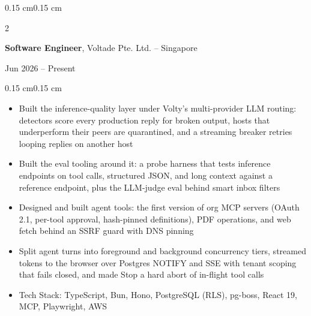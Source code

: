 \documentclass[10pt, letterpaper]{article}
\newenvironment{highlights}{
    \begin{itemize}[
        topsep=0.08 cm,
        parsep=0.05 cm,
        partopsep=0pt,
        itemsep=0pt,
        leftmargin=0.4 cm
    ]
}{
    \end{itemize}
}
\newenvironment{onecolentry}{
    \begin{adjustwidth}{0.15 cm}{0.15 cm}
}{
    \end{adjustwidth}
}
\newenvironment{twocolentry}[2][]{
    \onecolentry
    \def\secondColumn{#2}
    \setcolumnwidth{\fill, 4.5 cm}
    \begin{paracol}{2}
}{
    \switchcolumn \raggedleft \secondColumn
    \end{paracol}
    \endonecolentry
}
\begin{document}
        \begin{twocolentry}{
            Jun 2026 -- Present
        }
            \textbf{Software Engineer}, Voltade Pte. Ltd. -- Singapore
        \end{twocolentry}
        \vspace{0.08 cm}
        \begin{onecolentry}
            \begin{highlights}
                \item Built the inference-quality layer under Volty's multi-provider LLM routing: detectors score every production reply for broken output, hosts that underperform their peers are quarantined, and a streaming breaker retries looping replies on another host
                \item Built the eval tooling around it: a probe harness that tests inference endpoints on tool calls, structured JSON, and long context against a reference endpoint, plus the LLM-judge eval behind smart inbox filters
                \item Designed and built agent tools: the first version of org MCP servers (OAuth 2.1, per-tool approval, hash-pinned definitions), PDF operations, and web fetch behind an SSRF guard with DNS pinning
                \item Split agent turns into foreground and background concurrency tiers, streamed tokens to the browser over Postgres NOTIFY and SSE with tenant scoping that fails closed, and made Stop a hard abort of in-flight tool calls
                \item Tech Stack: TypeScript, Bun, Hono, PostgreSQL (RLS), pg-boss, React 19, MCP, Playwright, AWS
            \end{highlights}
        \end{onecolentry}

        \vspace{0.15 cm}
\end{document}
